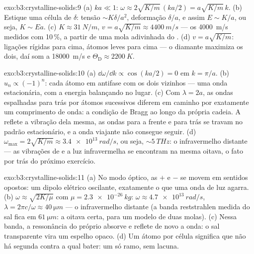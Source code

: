 \begin{solution}{exo:b3:crystalline-solids:9}
(a) $ka \ll 1$: $\omega \approx 2\sqrt{K/m}\,(ka/2) =
a\sqrt{K/m}\,k$. (b) Estique uma célula de $\delta$: tensão $\sim
K\delta/a^2$, deformação $\delta/a$, e assim $E \sim K/a$, ou seja, $K \sim
Ea$. (c) $K \approx \qty{31}{N/m}$, $v = a\sqrt{K/m} \approx
\qty{4400}{m/s}$ --- os \qty{4000}{m/s} medidos com 10\,\%,
a partir de uma mola adivinhada do . (d) $v = a\sqrt{K/m}$:
ligações rígidas para cima, átomos leves para cima --- o diamante
maximiza os dois, daí som a \qty{18000}{m/s} e $\Theta_{\text{D}} \approx
\qty{2200}{K}$.
\end{solution}

\begin{solution}{exo:b3:crystalline-solids:10}
(a) $\dd\omega/\dd k \propto \cos(ka/2) = 0$ em $k = \pi/a$. (b)
$u_n \propto (-1)^n$: cada átomo em antifase com os dois
vizinhos --- uma onda estacionária, com a energia balançando no lugar. (c)
Com $\lambda = 2a$, as ondas espalhadas para trás por átomos
sucessivos diferem em caminho por exatamente um comprimento de onda: a
condição de Bragg ao longo da própria cadeia. A  reflete a
vibração dela mesma, as ondas para a frente e para trás se travam no
padrão estacionário, e a onda viajante não consegue seguir. (d) $\omega_{\text{max}} = 2\sqrt{K/m} \approx
\qty{3.4e13}{rad/s}$, ou seja, $\sim\qty{5}{THz}$: o infravermelho distante
--- as vibrações de  e a luz infravermelha se encontram na mesma
oitava, o fato por trás do próximo exercício.
\end{solution}

\begin{solution}{exo:b3:crystalline-solids:11}
(a) No modo óptico, as  $+$ e $-$ se movem em sentidos
opostos: um dipolo elétrico oscilante, exatamente o que uma onda de luz
agarra. (b) $\omega \approx \sqrt{2K/\mu}$ com $\mu =
\qty{2.3e-26}{kg}$: $\omega \approx \qty{4.7e13}{rad/s}$,
$\lambda = 2\pi c/\omega \approx \qty{40}{\micro m}$ --- o
infravermelho distante (a banda reststrahlen medida do sal fica em
$\qty{61}{\micro m}$: a oitava certa, para um modelo de duas molas). (c)
Nessa banda, a ressonância do próprio  absorve e reflete de novo
a onda: o sal transparente vira um espelho opaco. (d) Um átomo por
célula significa que não há segunda  contra a qual bater: um só
ramo, sem lacuna.
\end{solution}

